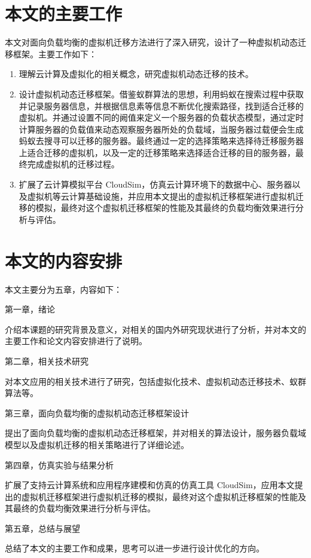 \section{本文的主要工作}
本文对面向负载均衡的虚拟机迁移方法进行了深入研究，设计了一种虚拟机动态迁移框架。主要工作如下：
\begin{enumerate}
    \item 理解云计算及虚拟化的相关概念，研究虚拟机动态迁移的技术。
    \item 设计虚拟机动态迁移框架。借鉴蚁群算法的思想，利用蚂蚁在搜索过程中获取并记录服务器信息，并根据信息素等信息不断优化搜索路径，找到适合迁移的虚拟机。并通过设置不同的阙值来定义一个服务器的负载状态模型，通过定时计算服务器的负载值来动态观察服务器所处的负载域，当服务器过载便会生成蚂蚁去搜寻可以迁移的服务器。最终通过一定的选择策略来选择待迁移服务器上适合迁移的虚拟机，以及一定的迁移策略来选择适合迁移的目的服务器，最终完成虚拟机的迁移过程。
    \item 扩展了云计算模拟平台 CloudSim，仿真云计算环境下的数据中心、服务器以及虚拟机等云计算基础设施，并应用本文提出的虚拟机迁移框架进行虚拟机迁移的模拟，最终对这个虚拟机迁移框架的性能及其最终的负载均衡效果进行分析与评估。
\end{enumerate}

\section{本文的内容安排}
本文主要分为五章，内容如下：

第一章，绪论

介绍本课题的研究背景及意义，对相关的国内外研究现状进行了分析，并对本文的主要工作和论文内容安排进行了说明。

第二章，相关技术研究

对本文应用的相关技术进行了研究，包括虚拟化技术、虚拟机动态迁移技术、蚁群算法等。

第三章，面向负载均衡的虚拟机动态迁移框架设计

提出了面向负载均衡的虚拟机动态迁移框架，并对相关的算法设计，服务器负载域模型以及虚拟机迁移的相关策略进行了详细论述。

第四章，仿真实验与结果分析

扩展了支持云计算系统和应用程序建模和仿真的仿真工具 CloudSim，应用本文提出的虚拟机迁移框架进行虚拟机迁移的模拟，最终对这个虚拟机迁移框架的性能及其最终的负载均衡效果进行分析与评估。

第五章，总结与展望

总结了本文的主要工作和成果，思考可以进一步进行设计优化的方向。

